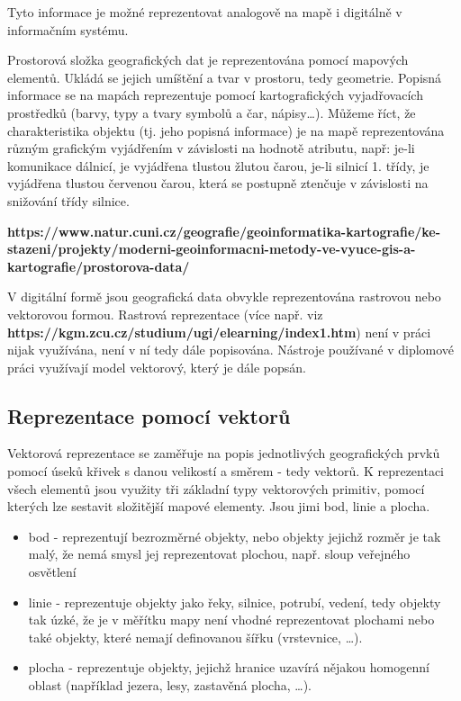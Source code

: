 Tyto informace je možné reprezentovat analogově na mapě i digitálně v informačním systému.

Prostorová složka geografických dat je reprezentována pomocí mapových elementů. Ukládá se jejich umíštění a tvar v prostoru, tedy geometrie. Popisná informace se na mapách reprezentuje pomocí kartografických vyjadřovacích prostředků (barvy, typy a tvary symbolů a čar, nápisy…). Můžeme říct, že charakteristika objektu (tj. jeho popisná informace) je na mapě reprezentována různým grafickým vyjádřením v závislosti na hodnotě atributu, např: je-li komunikace dálnicí, je vyjádřena tlustou žlutou čarou, je-li silnicí 1. třídy, je vyjádřena tlustou červenou čarou, která se postupně ztenčuje v závislosti na snižování třídy silnice. 

\textbf{https://www.natur.cuni.cz/geografie/geoinformatika-kartografie/ke-stazeni/projekty/moderni-geoinformacni-metody-ve-vyuce-gis-a-kartografie/prostorova-data/} 

V digitální formě jsou geografická data obvykle reprezentována rastrovou nebo vektorovou formou. Rastrová reprezentace (více např. viz \textbf{https://kgm.zcu.cz/studium/ugi/elearning/index1.htm}) není v práci nijak využívána, není v ní tedy dále popisována. Nástroje používané v diplomové práci využívají model vektorový, který je dále popsán.

\subsection{Reprezentace pomocí vektorů}
\label{subsection:reprezentace_pomoci_vektoru}

Vektorová reprezentace se zaměřuje na popis jednotlivých geografických prvků pomocí úseků křivek s danou velikostí a směrem - tedy vektorů. K reprezentaci všech elementů jsou využity tři základní typy vektorových primitiv, pomocí kterých lze sestavit složitější mapové elementy. Jsou jimi bod, linie a plocha.

\begin{itemize}
  \item bod - reprezentují bezrozměrné objekty, nebo objekty jejichž rozměr je tak malý, že nemá smysl jej reprezentovat plochou, např. sloup veřejného osvětlení 
  \item linie - reprezentuje objekty jako řeky, silnice, potrubí, vedení, tedy objekty tak úzké, že je v měřítku mapy není vhodné reprezentovat plochami nebo také objekty, které nemají definovanou šířku (vrstevnice, …).
  \item plocha - reprezentuje objekty, jejichž hranice uzavírá nějakou homogenní oblast (například jezera, lesy, zastavěná plocha, …).
  \end{itemize} 

